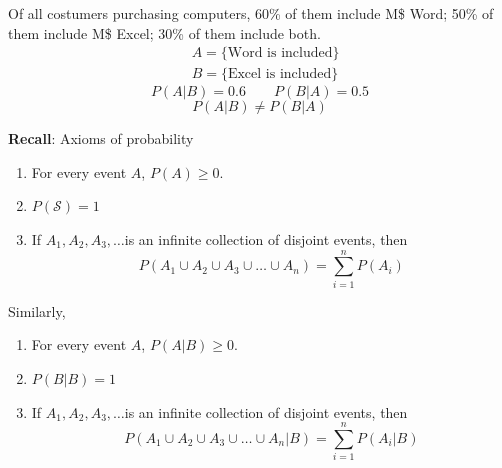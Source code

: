 \begin{exmp}
Of all costumers purchasing computers, 60\% of them include M\$ Word; 50\% of them include M\$ Excel; 30\% of them include both.
\begin{align*}
&A=\{\text{Word is included}\} 	\\
&B=\{\text{Excel is included}\}	
\end{align*}
\[P(A|B)=0.6 \qquad P(B|A)=0.5\] 
\[P(A|B)\neq P(B|A)\]
\end{exmp}

\textbf{Recall}:
Axioms of probability

\begin{enumerate}
\item  For every event $A$, $P(A)\geq 0$.
\item  $P(\mathcal{S})=1$
\item
If $A_1, A_2,A_3,\dots$is an infinite collection of disjoint events, then 
\[  P(A_1 \cup A_2\cup A_3 \cup \dots\cup A_n)=\sum_{i=1}^{n}P(A_i)
\]
\end{enumerate}

Similarly,
\begin{enumerate}
\item  For every event $A$, $P(A|B)\geq 0$.
\item  $P(B|B)=1$
\item  If $A_1, A_2,A_3,\dots$is an infinite collection of disjoint events, then 
\[  P(A_1 \cup A_2\cup A_3 \cup \dots\cup A_n|B)=\sum_{i=1}^{n}P(A_i|B) \]
\end{enumerate}


